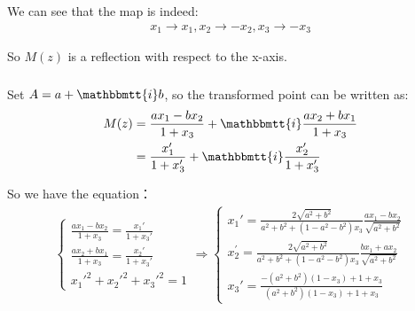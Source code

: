 \documentclass[]{ctexart}
\newcommand{\mi}{\mathbbmtt{i}}
\begin{document}
				We can see that the map is indeed:
					\begin{equation*}
					\begin{aligned}
						x_1\rightarrow x_1,x_2\rightarrow -x_2,x_3\rightarrow -x_3
					\end{aligned}
					\end{equation*}
				
				So $M(z)$ is a reflection with respect to the x-axis. 
			
			\subsubsection{}
				Set $A=a+\mi b$, so the transformed point can be written as:
					\begin{equation*}
					\begin{aligned}
						M(z)&=\frac{ax_1-bx_2}{1+x_3}+\mi \frac{ax_2+bx_1}{1+x_3}\\
						&=\frac{x_1'}{1+x_3'}+\mi \frac{x_2'}{1+x_3'}
					\end{aligned}
					\end{equation*}
				
				So we have the equation：
					\begin{equation*}
					\begin{aligned}
						\begin{cases}
							\frac{ax_1-bx_2}{1+x_3}=\frac{x_1'}{1+x_3'}\\
							\frac{ax_2+bx_1}{1+x_3}=\frac{x_2'}{1+x_3'}\\
							x_1'^2+x_2'^2+x_3'^2=1
						\end{cases}
						\Rightarrow
						\begin{cases}
							x_{1}'=\frac{2 \sqrt{a^{2}+b^{2}}}{a^{2}+b^{2}+\left(1-a^{2}-b^{2}\right) x_{3}} \frac{a x_{1}-b x_{2}}{\sqrt{a^{2}+b^{2}}} \\
							x_{2}^{\prime}=\frac{2 \sqrt{a^{2}+b^{2}}}{a^{2}+b^{2}+\left(1-a^{2}-b^{2}\right) x_{3}} \frac{b x_{1}+a x_{2}}{\sqrt{a^{2}+b^{2}}} \\
							x_{3}'=\frac{-\left(a^{2}+b^{2}\right)\left(1-x_{3}\right)+1+x_{3}}{\left(a^{2}+b^{2}\right)\left(1-x_{3}\right)+1+x_{3}}
						\end{cases}
					\end{aligned}
					\end{equation*}
				
\end{document}
